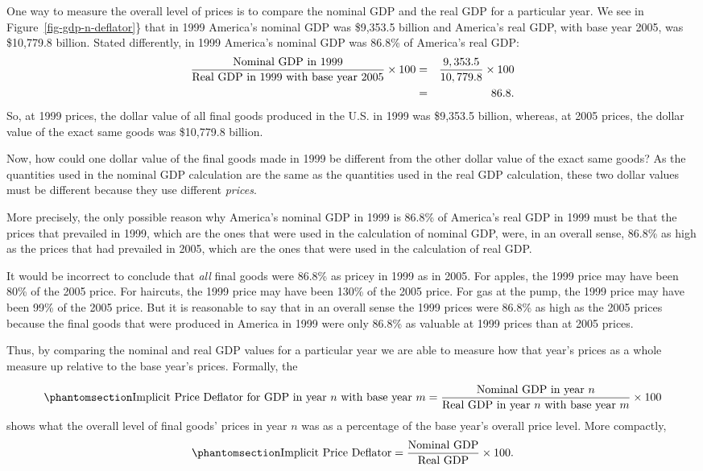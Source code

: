 \documentclass[
  letterpaper,
]{book}
\begin{document}
One way to measure the overall level of prices is to compare the nominal
GDP and the real GDP for a particular year. We see in
Figure~\ref{fig-gdp-n-deflator}\} that in 1999 America's nominal GDP was
\$9,353.5 billion and America's real GDP, with base year 2005, was
\$10,779.8 billion. Stated differently, in 1999 America's nominal GDP
was 86.8\% of America's real GDP: \begin{eqnarray*} 
\frac{\hbox{Nominal GDP in 1999}}{\hbox{Real GDP in 1999 with base year 2005}}\times 100&=&\frac{9,353.5}{10,779.8}\times 100\\
&=& 86.8.
\end{eqnarray*} So, at 1999 prices, the dollar value of all final goods
produced in the U.S. in 1999 was \$9,353.5 billion, whereas, at 2005
prices, the dollar value of the exact same goods was \$10,779.8 billion.

Now, how could one dollar value of the final goods made in 1999 be
different from the other dollar value of the exact same goods? As the
quantities used in the nominal GDP calculation are the same as the
quantities used in the real GDP calculation, these two dollar values
must be different because they use different \emph{prices}.

More precisely, the only possible reason why America's nominal GDP in
1999 is 86.8\% of America's real GDP in 1999 must be that the prices
that prevailed in 1999, which are the ones that were used in the
calculation of nominal GDP, were, in an overall sense, 86.8\% as high as
the prices that had prevailed in 2005, which are the ones that were used
in the calculation of real GDP.

It would be incorrect to conclude that \emph{all} final goods were
86.8\% as pricey in 1999 as in 2005. For apples, the 1999 price may have
been 80\% of the 2005 price. For haircuts, the 1999 price may have been
130\% of the 2005 price. For gas at the pump, the 1999 price may have
been 99\% of the 2005 price. But it is reasonable to say that in an
overall sense the 1999 prices were 86.8\% as high as the 2005 prices
because the final goods that were produced in America in 1999 were only
86.8\% as valuable at 1999 prices than at 2005 prices.

Thus, by comparing the nominal and real GDP values for a particular year
we are able to measure how that year's prices as a whole measure up
relative to the base year's prices. Formally, the

\begin{equation}\phantomsection\label{eq-IPDGDP}{
\hbox{Implicit Price Deflator for GDP in year $n$ with base year $m$} = \frac{\hbox{Nominal GDP in year $n$}}{\hbox{Real GDP in year $n$ with base year $m$}}\times 100
}\end{equation} shows what the overall level of final goods' prices in
year \(n\) was as a percentage of the base year's overall price level.
More compactly, \begin{equation}\phantomsection\label{eq-IPDGDP}{ 
\hbox{Implicit Price Deflator}=
\frac{\hbox{Nominal GDP}}{\hbox{Real GDP}}\times 100.
}\end{equation}
\end{document}
